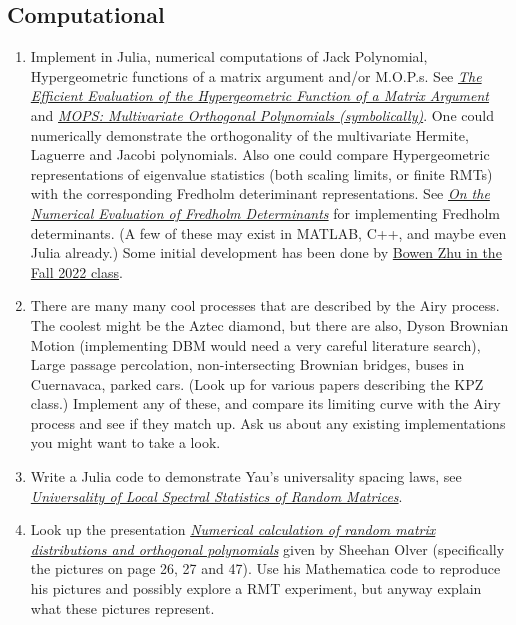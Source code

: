 \documentclass{article}
\begin{document}
\subsection*{Computational}
\begin{enumerate}
    \item Implement in Julia, numerical computations of Jack Polynomial, Hypergeometric functions of a matrix argument and/or M.O.P.s. See \href{https://arxiv.org/pdf/math/0505344.pdf}{\emph{\color{blue}The Efficient Evaluation of the Hypergeometric Function of a Matrix Argument}} and \href{https://arxiv.org/pdf/math-ph/0409066.pdf}{\emph{\color{blue}MOPS: Multivariate Orthogonal Polynomials (symbolically)}}. One could numerically demonstrate the orthogonality of the multivariate Hermite, Laguerre and Jacobi polynomials. Also one could compare Hypergeometric representations of eigenvalue statistics (both scaling limits, or finite RMTs) with the corresponding Fredholm deteriminant representations. See \href{https://arxiv.org/pdf/0804.2543.pdf}{\emph{\color{blue}On the Numerical Evaluation of Fredholm Determinants}} for implementing Fredholm determinants. (A few of these may exist in MATLAB, C++, and maybe even Julia already.) Some initial development has been done by \href{https://github.com/mitmath/18338/blob/master/projects/2022/bz_report.pdf}{\color{blue}Bowen Zhu in the Fall 2022 class}.     
    \item There are many many cool processes that are described by the Airy process. The coolest might be the Aztec diamond, but there are also, Dyson Brownian Motion (implementing DBM would need a very careful literature search), Large passage percolation, non-intersecting Brownian bridges, buses in Cuernavaca, parked cars. (Look up for various papers describing the KPZ class.) Implement any of these, and compare its limiting curve with the Airy process and see if they match up. Ask us about any existing implementations you might want to take a look. 
    \item Write a Julia code to demonstrate Yau's universality spacing laws, see \href{http://www.ams.org/journals/bull/0000-000-00/S0273-0979-2012-01372-1/S0273-0979-2012-01372-1.pdf}{\emph{\color{blue}Universality of Local Spectral Statistics of Random Matrices}}.
    \item Look up the presentation \href{http://www.maths.usyd.edu.au/u/olver/talks/RandomMatrix.pdf}{\emph{\color{blue}Numerical calculation of random matrix distributions and orthogonal polynomials}} given by Sheehan Olver (specifically the pictures on page 26, 27 and 47). Use his Mathematica code to reproduce his pictures and possibly explore a RMT experiment, but anyway explain what these pictures represent.

\end{enumerate}
\end{document}
